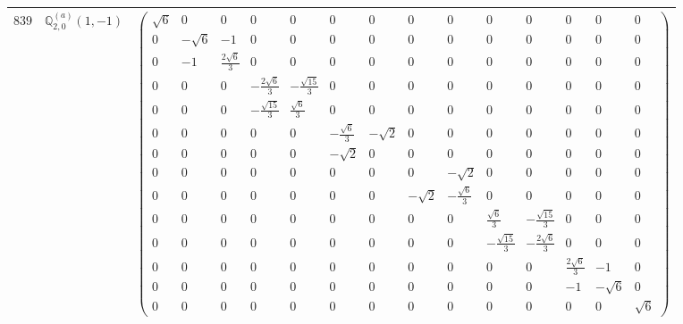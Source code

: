 \documentclass[fleqn,8pt,landscape]{jsarticle}
\begin{document}
\begin{center}
\begin{longtable}{ccc}
$ 839 $ & $ \mathbb{Q}_{2,0}^{(a)}(1,-1) $ & $ \begin{pmatrix} \sqrt{6} & 0 & 0 & 0 & 0 & 0 & 0 & 0 & 0 & 0 & 0 & 0 & 0 & 0 \\ 0 & - \sqrt{6} & -1 & 0 & 0 & 0 & 0 & 0 & 0 & 0 & 0 & 0 & 0 & 0 \\ 0 & -1 & \frac{2 \sqrt{6}}{3} & 0 & 0 & 0 & 0 & 0 & 0 & 0 & 0 & 0 & 0 & 0 \\ 0 & 0 & 0 & - \frac{2 \sqrt{6}}{3} & - \frac{\sqrt{15}}{3} & 0 & 0 & 0 & 0 & 0 & 0 & 0 & 0 & 0 \\ 0 & 0 & 0 & - \frac{\sqrt{15}}{3} & \frac{\sqrt{6}}{3} & 0 & 0 & 0 & 0 & 0 & 0 & 0 & 0 & 0 \\ 0 & 0 & 0 & 0 & 0 & - \frac{\sqrt{6}}{3} & - \sqrt{2} & 0 & 0 & 0 & 0 & 0 & 0 & 0 \\ 0 & 0 & 0 & 0 & 0 & - \sqrt{2} & 0 & 0 & 0 & 0 & 0 & 0 & 0 & 0 \\ 0 & 0 & 0 & 0 & 0 & 0 & 0 & 0 & - \sqrt{2} & 0 & 0 & 0 & 0 & 0 \\ 0 & 0 & 0 & 0 & 0 & 0 & 0 & - \sqrt{2} & - \frac{\sqrt{6}}{3} & 0 & 0 & 0 & 0 & 0 \\ 0 & 0 & 0 & 0 & 0 & 0 & 0 & 0 & 0 & \frac{\sqrt{6}}{3} & - \frac{\sqrt{15}}{3} & 0 & 0 & 0 \\ 0 & 0 & 0 & 0 & 0 & 0 & 0 & 0 & 0 & - \frac{\sqrt{15}}{3} & - \frac{2 \sqrt{6}}{3} & 0 & 0 & 0 \\ 0 & 0 & 0 & 0 & 0 & 0 & 0 & 0 & 0 & 0 & 0 & \frac{2 \sqrt{6}}{3} & -1 & 0 \\ 0 & 0 & 0 & 0 & 0 & 0 & 0 & 0 & 0 & 0 & 0 & -1 & - \sqrt{6} & 0 \\ 0 & 0 & 0 & 0 & 0 & 0 & 0 & 0 & 0 & 0 & 0 & 0 & 0 & \sqrt{6} \end{pmatrix} $ \\ \hline

\end{longtable}
\end{center}
\end{document}
